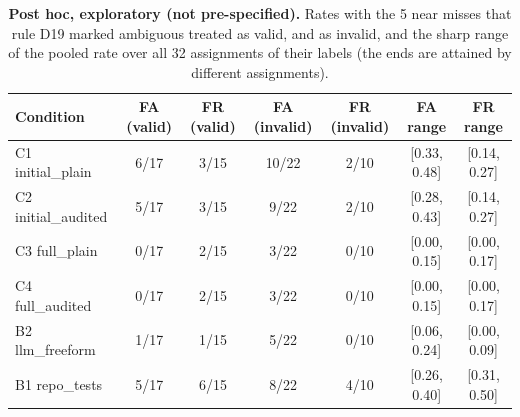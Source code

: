 \begin{table}[t]\centering\footnotesize
\caption{\textbf{Post hoc, exploratory (not pre-specified).} Rates with the 5 near misses that rule D19 marked ambiguous treated as valid, and as invalid, and the sharp range of the pooled rate over all 32 assignments of their labels (the ends are attained by different assignments).}\label{tab:expl-bounds}
\begin{tabular}{lcccccc}\toprule Condition & FA (valid) & FR (valid) & FA (invalid) & FR (invalid) & FA range & FR range \\\midrule
C1 initial\_plain & 6/17 & 3/15 & 10/22 & 2/10 & [0.33, 0.48] & [0.14, 0.27] \\
C2 initial\_audited & 5/17 & 3/15 & 9/22 & 2/10 & [0.28, 0.43] & [0.14, 0.27] \\
C3 full\_plain & 0/17 & 2/15 & 3/22 & 0/10 & [0.00, 0.15] & [0.00, 0.17] \\
C4 full\_audited & 0/17 & 2/15 & 3/22 & 0/10 & [0.00, 0.15] & [0.00, 0.17] \\
B2 llm\_freeform & 1/17 & 1/15 & 5/22 & 0/10 & [0.06, 0.24] & [0.00, 0.09] \\
B1 repo\_tests & 5/17 & 6/15 & 8/22 & 4/10 & [0.26, 0.40] & [0.31, 0.50] \\
\bottomrule\end{tabular}\end{table}
